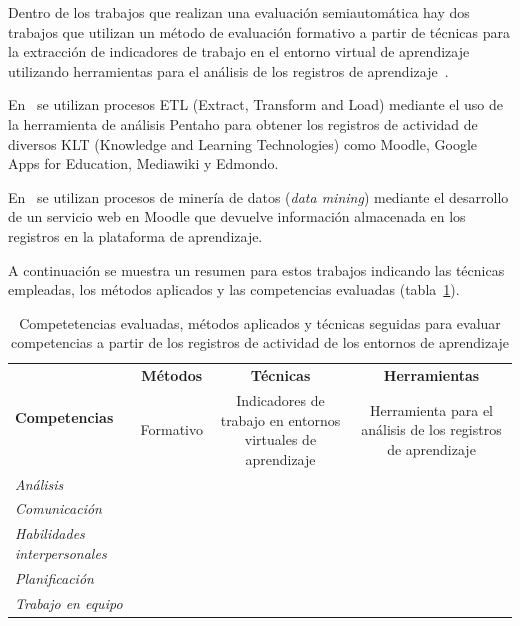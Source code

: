 Dentro de los trabajos que realizan una evaluación semiautomática hay dos trabajos que utilizan un método de evaluación formativo a partir de técnicas para la extracción de indicadores de trabajo en el entorno virtual de aprendizaje utilizando herramientas para el análisis de los registros de aprendizaje~\cite{rayon2014web,fidalgo:2015}. 

En~\cite{rayon2014web} se utilizan procesos ETL (Extract, Transform and Load) mediante el uso de la herramienta de análisis Pentaho para obtener los registros de actividad de diversos KLT (Knowledge and Learning Technologies) como Moodle, Google Apps for Education, Mediawiki y Edmondo.

En~\cite{fidalgo:2015} se utilizan procesos de minería de datos (\emph{data mining}) mediante el desarrollo de un servicio web en Moodle que devuelve información almacenada en los registros en la plataforma de aprendizaje.

A continuación se muestra un resumen para estos trabajos indicando las técnicas empleadas, los métodos aplicados y las competencias evaluadas (tabla~\ref{tab:CompetenciasMetodosTecnicas}).

\begin{table}[h]
  \begin{center}
  \setlength\tabcolsep{2.5pt}
  \begin{tabular}{| l | c | c | c |}
    \hline
     \multirow{4}{*}{\textbf{Competencias}} & \textbf{Métodos} & \textbf{Técnicas} 		& \textbf{Herramientas} \\
    \cline{2-4}
     & \multirow{3}{*}{Formativo}  & \multirow{3}{4cm}{Indicadores de trabajo en entornos virtuales de aprendizaje} & \multirow{3}{3.9cm}{Herramienta para el análisis de los registros de aprendizaje} \\
     &   								&  															& \\
     &   								&  															&  \\
    \hline
    \hline
    \emph{Análisis} & \multicolumn{3}{c|}{ \multirow{6}{*}{\cite{rayon2014web} }}  \\
    \cline{1-1}
    \emph{Comunicación} & \multicolumn{3}{c|}{}  \\
    \cline{1-1}
    \multirow{2}{3cm}{\emph{\centering Habilidades interpersonales}} & \multicolumn{3}{c|}{} \\
     & \multicolumn{3}{c|}{} \\
    \cline{1-1}
    \emph{Planificación} & \multicolumn{3}{c|}{}  \\
    \cline{1-1}
    \multirow{2}{*}{\emph{Trabajo en equipo}} & \multicolumn{3}{c|}{} \\
    \cline{2-4}
     & \multicolumn{3}{c|}{\cite{fidalgo:2015}}  \\
    \hline
  \end{tabular}
\end{center}
\caption{Competetencias evaluadas, métodos aplicados y técnicas seguidas para evaluar competencias a partir de los registros de actividad de los entornos de aprendizaje}
\label{tab:CompetenciasMetodosTecnicas}
\end{table}

